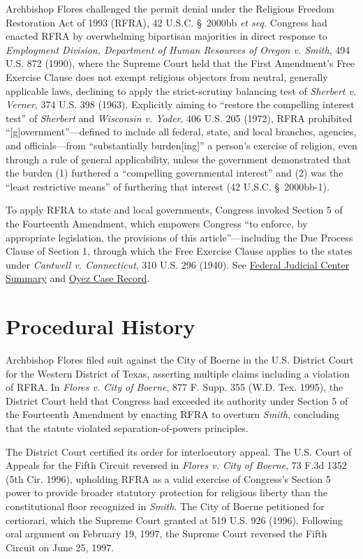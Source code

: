 \documentclass[12pt]{article}
\begin{document}
Archbishop Flores challenged the permit denial under the Religious Freedom Restoration Act of 1993 (RFRA), 42 U.S.C. \S~2000bb \textit{et seq.} Congress had enacted RFRA by overwhelming bipartisan majorities in direct response to \textit{Employment Division, Department of Human Resources of Oregon v. Smith}, 494 U.S. 872 (1990), where the Supreme Court held that the First Amendment's Free Exercise Clause does not exempt religious objectors from neutral, generally applicable laws, declining to apply the strict-scrutiny balancing test of \textit{Sherbert v. Verner}, 374 U.S. 398 (1963). Explicitly aiming to ``restore the compelling interest test'' of \textit{Sherbert} and \textit{Wisconsin v. Yoder}, 406 U.S. 205 (1972), RFRA prohibited ``[g]overnment''---defined to include all federal, state, and local branches, agencies, and officials---from ``substantially burden[ing]'' a person's exercise of religion, even through a rule of general applicability, unless the government demonstrated that the burden (1) furthered a ``compelling governmental interest'' and (2) was the ``least restrictive means'' of furthering that interest (42 U.S.C. \S~2000bb-1).

To apply RFRA to state and local governments, Congress invoked Section 5 of the Fourteenth Amendment, which empowers Congress ``to enforce, by appropriate legislation, the provisions of this article''---including the Due Process Clause of Section 1, through which the Free Exercise Clause applies to the states under \textit{Cantwell v. Connecticut}, 310 U.S. 296 (1940). See \href{https://www.fjc.gov/history/cases/cases-that-shaped-the-federal-courts/city-boerne-v-flores}{Federal Judicial Center Summary} and \href{https://www.oyez.org/cases/1996/95-2074}{Oyez Case Record}.

\section{Procedural History}

Archbishop Flores filed suit against the City of Boerne in the U.S. District Court for the Western District of Texas, asserting multiple claims including a violation of RFRA. In \textit{Flores v. City of Boerne}, 877 F. Supp. 355 (W.D. Tex. 1995), the District Court held that Congress had exceeded its authority under Section 5 of the Fourteenth Amendment by enacting RFRA to overturn \textit{Smith}, concluding that the statute violated separation-of-powers principles.

The District Court certified its order for interlocutory appeal. The U.S. Court of Appeals for the Fifth Circuit reversed in \textit{Flores v. City of Boerne}, 73 F.3d 1352 (5th Cir. 1996), upholding RFRA as a valid exercise of Congress's Section 5 power to provide broader statutory protection for religious liberty than the constitutional floor recognized in \textit{Smith}. The City of Boerne petitioned for certiorari, which the Supreme Court granted at 519 U.S. 926 (1996). Following oral argument on February 19, 1997, the Supreme Court reversed the Fifth Circuit on June 25, 1997.
\end{document}
